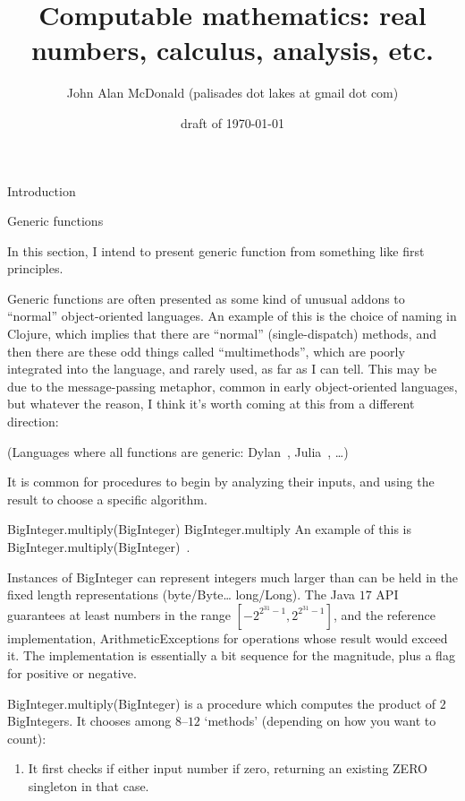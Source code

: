 \documentclass[12pt]{PalisadesLakesBook}
\title{Computable mathematics:
real numbers, calculus, analysis, etc.}
\author{John Alan McDonald 
(palisades dot lakes at gmail dot com)}
\date{draft of \today}
\begin{document}
\maketitle
{}
\begin{plSection}{Introduction} 
 

\end{plSection}%
\begin{plSection}{Generic functions} 

In this section, I intend to present generic function 
from something like first principles.

Generic functions are often presented as some kind of unusual 
addons to ``normal'' object-oriented languages.
An example of this is the choice of  naming in Clojure,
which implies that there are ``normal'' (single-dispatch)
methods, and then there are these odd things called 
``multimethods'', 
which are poorly integrated into the language,
and rarely used, as far as I can tell.
This may be due to the message-passing metaphor,
common in early object-oriented languages,
but whatever the reason, 
I think it's worth coming at this from a different direction:

(Languages where all functions are generic: 
Dylan~\cite{ShalitPiazzaMoon:1992:Dylan}, 
Julia~\cite{Bezanson:2017:Julia}, \ldots)

It is common for procedures to begin by analyzing their inputs,
and using the result to choose a specific algorithm.

\begin{plExample}{{\javaFont BigInteger.multiply(BigInteger)}
}{BigInteger.multiply}
An example of this is 
{\javaFont 
BigInteger.multiply(BigInteger)}~\cite{BigInteger.multiply:2021}.

Instances of {\javaFont BigInteger} can represent 
integers much larger than can be held in the fixed length
representations 
({\javaFont byte}/{\javaFont Byte}\ldots
{\javaFont long}/{\javaFont Long}).
The Java $17$ API~\cite{Oracle:2021:JDK17} 
guarantees at least numbers in the range
$\left[ -2^{{2^{31}}-1}, 2^{{2^{31}}-1} \right]$,
and the reference implementation,
 {\javaFont ArithmeticException}s for operations whose result
would exceed it.
The implementation is essentially a bit sequence 
for the magnitude, 
plus a flag for positive or negative.

{\javaFont BigInteger.multiply(BigInteger)} 
is a procedure which computes the product of $2$ 
{\javaFont BigInteger}s.
It chooses among $8$--$12$ `methods' (depending on how you want to
count):
\begin{enumerate}
  \item It first checks if either input number if zero,
returning an existing {\javaFont ZERO} singleton in that case.


\end{enumerate}
\end{plExample}
\end{plSection}
\end{document}
